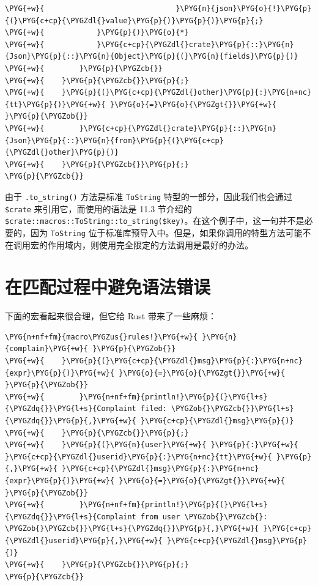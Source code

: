 \begin{Verbatim}[commandchars=\\\{\},breaklines=true,breakanywhere=true,fontsize=\codefont,xleftmargin=17bp]
\PYG{+w}{                              }\PYG{n}{json}\PYG{o}{!}\PYG{p}{(}\PYG{c+cp}{\PYGZdl{}value}\PYG{p}{)}\PYG{p}{)}\PYG{p}{;}
\PYG{+w}{            }\PYG{p}{)}\PYG{o}{*}
\PYG{+w}{            }\PYG{c+cp}{\PYGZdl{}crate}\PYG{p}{::}\PYG{n}{Json}\PYG{p}{::}\PYG{n}{Object}\PYG{p}{(}\PYG{n}{fields}\PYG{p}{)}
\PYG{+w}{        }\PYG{p}{\PYGZcb{}}
\PYG{+w}{    }\PYG{p}{\PYGZcb{}}\PYG{p}{;}
\PYG{+w}{    }\PYG{p}{(}\PYG{c+cp}{\PYGZdl{}other}\PYG{p}{:}\PYG{n+nc}{tt}\PYG{p}{)}\PYG{+w}{ }\PYG{o}{=}\PYG{o}{\PYGZgt{}}\PYG{+w}{ }\PYG{p}{\PYGZob{}}
\PYG{+w}{        }\PYG{c+cp}{\PYGZdl{}crate}\PYG{p}{::}\PYG{n}{Json}\PYG{p}{::}\PYG{n}{from}\PYG{p}{(}\PYG{c+cp}{\PYGZdl{}other}\PYG{p}{)}
\PYG{+w}{    }\PYG{p}{\PYGZcb{}}\PYG{p}{;}
\PYG{p}{\PYGZcb{}}
\end{Verbatim}

由于 \texttt{.to\_string()} 方法是标准 \texttt{ToString} 特型的一部分，因此我们也会通过 \texttt{\$crate} 来引用它，而使用的语法是 11.3 节介绍的 \texttt{\$crate::macros::ToString::to\_string(\$key)}。在这个例子中，这一句并不是必要的，因为 \texttt{ToString} 位于标准库预导入中。但是，如果你调用的特型方法可能不在调用宏的作用域内，则使用完全限定的方法调用是最好的办法。

\section{在匹配过程中避免语法错误}

下面的宏看起来很合理，但它给 Rust 带来了一些麻烦：

\begin{Verbatim}[commandchars=\\\{\},breaklines=true,breakanywhere=true,fontsize=\codefont,xleftmargin=17bp]
\PYG{n+nf+fm}{macro\PYGZus{}rules!}\PYG{+w}{ }\PYG{n}{complain}\PYG{+w}{ }\PYG{p}{\PYGZob{}}
\PYG{+w}{    }\PYG{p}{(}\PYG{c+cp}{\PYGZdl{}msg}\PYG{p}{:}\PYG{n+nc}{expr}\PYG{p}{)}\PYG{+w}{ }\PYG{o}{=}\PYG{o}{\PYGZgt{}}\PYG{+w}{ }\PYG{p}{\PYGZob{}}
\PYG{+w}{        }\PYG{n+nf+fm}{println!}\PYG{p}{(}\PYG{l+s}{\PYGZdq{}}\PYG{l+s}{Complaint filed: \PYGZob{}\PYGZcb{}}\PYG{l+s}{\PYGZdq{}}\PYG{p}{,}\PYG{+w}{ }\PYG{c+cp}{\PYGZdl{}msg}\PYG{p}{)}
\PYG{+w}{    }\PYG{p}{\PYGZcb{}}\PYG{p}{;}
\PYG{+w}{    }\PYG{p}{(}\PYG{n}{user}\PYG{+w}{ }\PYG{p}{:}\PYG{+w}{ }\PYG{c+cp}{\PYGZdl{}userid}\PYG{p}{:}\PYG{n+nc}{tt}\PYG{+w}{ }\PYG{p}{,}\PYG{+w}{ }\PYG{c+cp}{\PYGZdl{}msg}\PYG{p}{:}\PYG{n+nc}{expr}\PYG{p}{)}\PYG{+w}{ }\PYG{o}{=}\PYG{o}{\PYGZgt{}}\PYG{+w}{ }\PYG{p}{\PYGZob{}}
\PYG{+w}{        }\PYG{n+nf+fm}{println!}\PYG{p}{(}\PYG{l+s}{\PYGZdq{}}\PYG{l+s}{Complaint from user \PYGZob{}\PYGZcb{}: \PYGZob{}\PYGZcb{}}\PYG{l+s}{\PYGZdq{}}\PYG{p}{,}\PYG{+w}{ }\PYG{c+cp}{\PYGZdl{}userid}\PYG{p}{,}\PYG{+w}{ }\PYG{c+cp}{\PYGZdl{}msg}\PYG{p}{)}
\PYG{+w}{    }\PYG{p}{\PYGZcb{}}\PYG{p}{;}
\PYG{p}{\PYGZcb{}}
\end{Verbatim}

